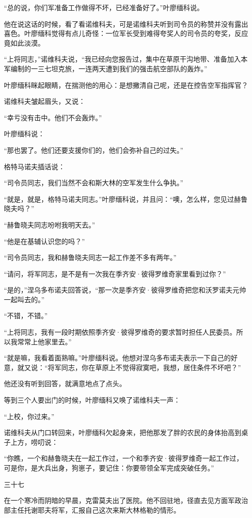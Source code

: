 “总的说，你们军准备工作做得不坏，已经准备好了。”叶廖缅科说。

他在说这话的时候，看了看诺维科夫，可是诺维科夫听到司令员的称赞并没有露出喜色。叶廖缅科觉得有点儿奇怪：一位军长受到难得夸奖人的司令员的夸奖，反应竟如此淡漠。

“上将同志，”诺维科夫说，“我已经向您报告过，集中在草原干沟地带、准备加入本军编制的一三七坦克旅，一连两天遭到我们的强击航空部队的轰炸。”

叶廖缅科眯起眼睛，在揣测他的用心：是想撇清自己呢，还是在控告空军指挥官？

诺维科夫皱起眉头，又说：

“幸亏没有击中。他们不会轰炸。”

叶廖缅科说：

“那也罢了。他们还要支援你们的，他们会弥补自己的过失。”

格特马诺夫插话说：

“司令员同志，我们当然不会和斯大林的空军发生什么争执。”

“就是，就是，格特马诺夫同志。”叶廖缅科说，并且问：“噢，怎么样，您见过赫鲁晓夫吗？”

“赫鲁晓夫同志吩咐我明天去。”

“他是在基辅认识您的吗？”

“司令员同志，我和赫鲁晓夫同志一起工作差不多有两年。”

“请问，将军同志，是不是有一次我在季齐安·彼得罗维奇家里看到过你？”

“是的，”涅乌多布诺夫回答说，“那一次是季齐安·彼得罗维奇把您和沃罗诺夫元帅一起叫去的。”

“不错，不错。”

“上将同志，我有一段时期依照季齐安·彼得罗维奇的要求暂时担任人民委员。所以我常常上他家里去。”

“就是嘛，我看着面熟嘛。”叶廖缅科说。他想对涅乌多布诺夫表示一下自己的好意，就又说：“将军同志，你在草原上不觉得寂寞吧，我想，居住条件不坏吧？”

他还没有听到回答，就满意地点了点头。

等到三个人要出门的时候，叶廖缅科又唤了诺维科夫一声：

“上校，你过来。”

诺维科夫从门口转回来，叶廖缅科欠起身来，把他那发了胖的农民的身体抬高到桌子上方，唠叨说：

“你瞧，一个和赫鲁晓夫在一起工作过，一个和季齐安·彼得罗维奇一起工作过，可是你，是大兵出身，狗崽子，要记住：你要带领全军完成突破任务。”

三十七

在一个寒冷而阴暗的早晨，克雷莫夫出了医院。他不回驻地，径直去见方面军政治部主任托谢耶夫将军，汇报自己这次来斯大林格勒的情形。

